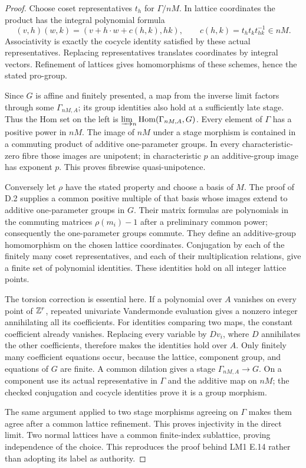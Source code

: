 \begin{proof}
Choose coset representatives $t_h$ for $\Gamma/nM$. In lattice coordinates
the product has the integral polynomial formula
\[
 (v,h)(w,k)=(v+h\cdot w+c(h,k),hk),
 \qquad c(h,k)=t_ht_kt_{hk}^{-1}\in nM.
\]
Associativity is exactly the cocycle identity satisfied by these actual
representatives. Replacing representatives translates coordinates by
integral vectors. Refinement of lattices gives homomorphisms of these
schemes, hence the stated pro-group.

Since $G$ is affine and finitely presented, a map from the inverse limit
factors through some $\Gamma_{nM,A}$; its group identities also hold at
a sufficiently late stage. Thus the Hom set on the left is
$\varinjlim_n\operatorname{Hom}(\Gamma_{nM,A},G)$. Every element of $\Gamma$ has
a positive power in $nM$. The image of $nM$ under a stage morphism
is contained in a commuting product of additive one-parameter groups.
In every characteristic-zero fibre those images are unipotent;
in characteristic $p$ an additive-group image has exponent $p$.
This proves fibrewise quasi-unipotence.

Conversely let $\rho$ have the stated property and choose a basis of $M$.
The proof of D.2 supplies a common positive multiple of that basis whose
images extend to additive one-parameter groups in $G$. Their matrix
formulas are polynomials in the commuting matrices $\rho(m_i)-1$
after a preliminary common power; consequently the one-parameter
groups commute. They define an additive-group homomorphism on the
chosen lattice coordinates. Conjugation by each of the finitely many
coset representatives, and each of their multiplication relations,
give a finite set of polynomial identities. These identities hold
on all integer lattice points.

The torsion correction is essential here. If a polynomial over $A$
vanishes on every point of $\mathbb Z^r$, repeated univariate Vandermonde
evaluation gives a nonzero integer annihilating all its coefficients.
For identities comparing two maps, the constant coefficient already
vanishes. Replacing every variable by $Dv_i$, where $D$ annihilates
the other coefficients, therefore makes the identities hold over $A$.
Only finitely many coefficient equations occur, because the lattice,
component group, and equations of $G$ are finite. A common dilation
gives a stage $\Gamma_{nM,A}\to G$. On a component use its actual
representative in $\Gamma$ and the additive map on $nM$; the checked
conjugation and cocycle identities prove it is a group morphism.

The same argument applied to two stage morphisms agreeing on $\Gamma$
makes them agree after a common lattice refinement. This proves
injectivity in the direct limit. Two normal lattices have a common
finite-index sublattice, proving independence of the choice. This
reproduces the proof behind LM1 E.14 rather than adopting its label
as authority.
\end{proof}

